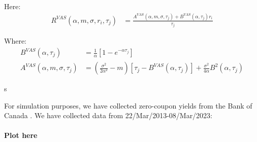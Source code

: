Here: 
\begin{align*}
R^{VAS}(\alpha, m, \sigma, r_{i}, \tau_{j})
&= 
\frac{
A^{VAS}(\alpha, m, \sigma, \tau_{j}) + B^{VAS}(\alpha, \tau_{j})r_{i}
}{
\tau_{j}
} 
\end{align*}

Where: 
\begin{align*}
B^{VAS}(\alpha, \tau_{j}) &= \frac{1}{\alpha}\left[
1 - e^{-\alpha \tau_{j}}
\right] \\ 
A^{VAS}(\alpha, m, \sigma, \tau_{j})
&= 
\left(
\frac{\sigma^{2}}{2\alpha^{2}} - m
\right)\left[
\tau_{j} - B^{VAS}(\alpha, \tau_{j})
\right]
+ \frac{\sigma^{2}}{4\alpha}B^{2}(\alpha, \tau_{j})
\end{align*}

\newpage 

s



\newpage 
For simulation purposes, we have collected zero-coupon yields from the Bank of Canada \cite{Canada_termyields}. We have collected data from 22/Mar/2013-08/Mar/2023: 
\\~\\ 
\textbf{Plot here}
\\~\\



